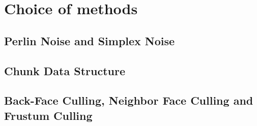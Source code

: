 \section{Choice of methods}

\subsection{Perlin Noise and Simplex Noise}

\subsection{Chunk Data Structure}

\subsection{Back-Face Culling, Neighbor Face Culling and Frustum Culling}

